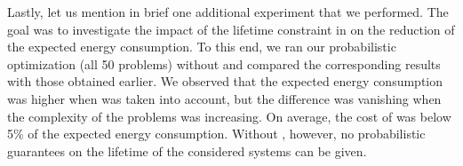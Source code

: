 Lastly, let us mention in brief one additional experiment that we performed.
The goal was to investigate the impact of the lifetime constraint in  on the reduction of the expected energy consumption.
To this end, we ran our probabilistic optimization (all 50 problems) without  and compared the corresponding results with those obtained earlier.
We observed that the expected energy consumption was higher when  was taken into account, but the difference was vanishing when the complexity of the problems was increasing.
On average, the cost of  was below 5\% of the expected energy consumption.
Without , however, no probabilistic guarantees on the lifetime of the considered systems can be given.
